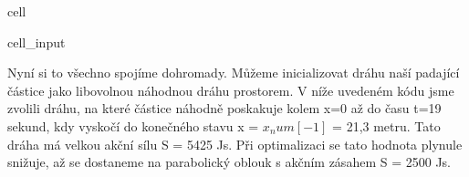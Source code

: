 \documentclass[letterpaper,10pt,english]{jupyterBook}
\begin{document}
\begin{sphinxuseclass}{cell}
\begin{sphinxVerbatimInput}
\begin{sphinxuseclass}{cell_input}
\begin{sphinxVerbatim}[commandchars=\\\{\}]
           
              
           
       
\end{sphinxVerbatim}

\end{sphinxuseclass}\end{sphinxVerbatimInput}

\end{sphinxuseclass}
\sphinxAtStartPar
Nyní si to všechno spojíme dohromady. Můžeme inicializovat dráhu naší padající částice jako libovolnou náhodnou dráhu prostorem. V níže uvedeném kódu jsme zvolili dráhu, na které částice náhodně poskakuje kolem x=0 až do času t=19 sekund, kdy vyskočí do konečného stavu x = \(x_num[-1]\) = 21,3 metru. Tato dráha má velkou akční sílu S = 5425 J\sphinxhyphen{}s. Při optimalizaci se tato hodnota plynule snižuje, až se dostaneme na parabolický oblouk s akčním zásahem S = \sphinxhyphen{}2500 Js.
\end{document}
